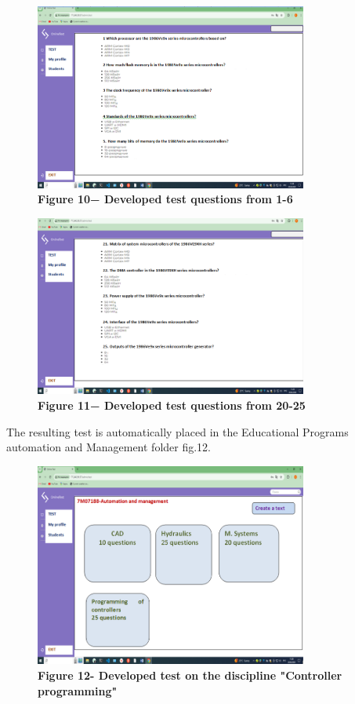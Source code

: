 \begin{figure}[H]
	\centering
	\includegraphics[width=0.8\textwidth]{assets/135}
	\caption*{\bfseries Figure 10− Developed test questions from 1-6}
\end{figure}


\begin{figure}[H]
	\centering
	\includegraphics[width=0.8\textwidth]{assets/136}
	\caption*{\bfseries Figure 11− Developed test questions from 20-25}
\end{figure}

\begin{multicols}{2}
The resulting test is automatically placed in the Educational Programs
automation and Management folder fig.12.
\end{multicols}

\begin{figure}[H]
	\centering
	\includegraphics[width=0.8\textwidth]{assets/137}
	\caption*{\bfseries Figure 12- Developed test on the discipline "Controller
	programming"}
\end{figure}

